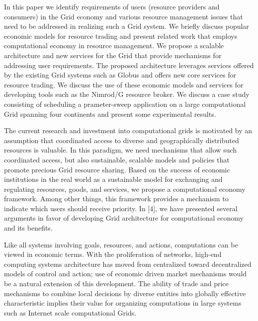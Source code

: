 \documentclass{article}
\begin{document}
In this paper we identify requirements of users (resource providers and consumers) in the Grid economy and various resource management issues that need to be addressed in realizing such a Grid system. We briefly discuss popular economic models for resource trading and present related work that employs computational economy in resource management. We propose a scalable architecture and new services for the Grid that provide mechanisms for addressing user requirements. The proposed architecture leverages services offered by the existing Grid systems such as Globus and offers new core services for resource trading. We discuss the use of these economic models and services for developing tools such as the Nimrod/G resource broker. We discuss a case study consisting of scheduling a prameter-sweep application on a large computational Grid spanning four continents and present some experimental results. 

The current research and investment into computational grids is motivated by an assumption that coordinated access to diverse and geographically distributed resources is valuable. In this paradigm, we need mechanisms that allow such coordinated access, but also sustainable, scalable models and policies that promote precious Grid resource sharing. Based on the success of economic institutions in the real world as a sustainable model for exchanging and regulating resources, goods, and services, we propose a computational economy framework. Among other things, this framework provides a mechanism to indicate which users should receive priority. In [4], we have presented several arguments in favor of developing Grid architecture for computational economy and its benefits.

Like all systems involving goals, resources, and actions, computations can be viewed in economic terms. With the proliferation of networks, high-end computing systems architecture has moved from centralized toward decentralized models of control and action; use of economic driven market mechanisms would be a natural extension of this development. The ability of trade and price mechanisms to combine local decisions by diverse entities into globally effective characteristic implies their value for organizing computations in large systems such as Internet scale computational Grids. 
\end{document}
